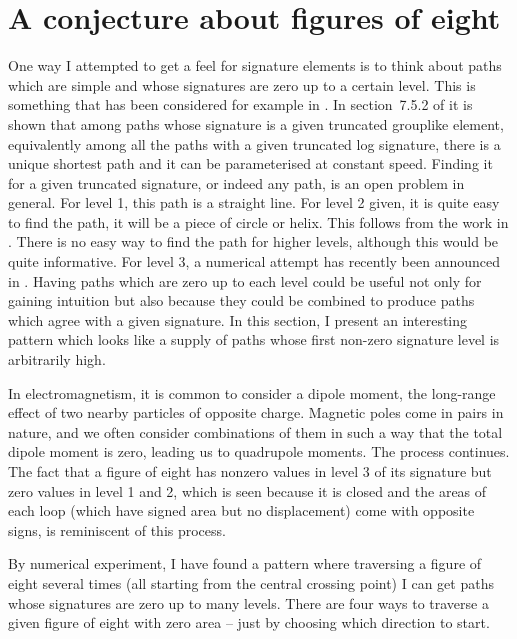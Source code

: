 \section{A conjecture about figures of eight}
One way I attempted to get a feel for signature elements is to think about paths which are simple and whose signatures are zero up to a certain level. This is something that has been considered for example in \cite{Gauthier}.
In section~7.5.2 of \cite{FrizVictoir} it is shown that among paths whose signature is a given truncated grouplike element, equivalently among all the paths with a given truncated log signature, there is a unique shortest path and it can be parameterised at constant speed. %
Finding it for a given truncated signature, or indeed any path, is an open problem in general.
For level 1, this path is a straight line.
For level 2 given, it is quite easy to find the path, it will be a piece of circle or helix. This follows from the work in \cite{BrockettDai}.
There is no easy way to find the path for higher levels, although this would be quite informative.
For level 3, a numerical attempt has recently been announced in \cite{AnnaInverting}.
Having paths which are zero up to each level could be useful not only for gaining intuition but also because they could be combined to produce paths which agree with a given signature.
In this section, I present an interesting pattern which looks like a supply of paths whose first non-zero signature level is arbitrarily high.

In electromagnetism, it is common to consider a dipole moment, the long-range effect of two nearby particles of opposite charge.
Magnetic poles come in pairs in nature, and we often consider combinations of them in such a way that the total dipole moment is zero, leading us to quadrupole moments. The process continues.
The fact that a figure of eight has nonzero values in level 3 of its signature but zero values in level 1 and 2, which is seen because it is closed and the areas of each loop (which have signed area but no displacement) come with opposite signs, is reminiscent of this process.

By numerical experiment, I have found a pattern where traversing a figure of eight several times (all starting from the central crossing point) I can get paths whose signatures are zero up to many levels. There are four ways to traverse a given figure of eight with zero area -- just by choosing which direction to start. 

